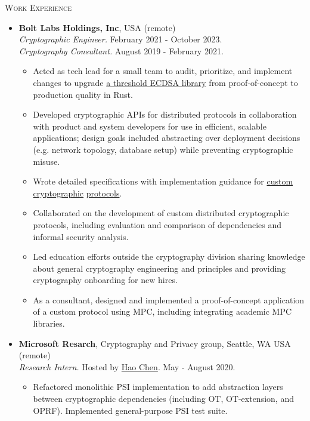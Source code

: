 \documentclass{article}
\begin{document}
\textsc{Work Experience}
\begin{itemize}[label={}, topsep=0pt]
  \item \textbf{Bolt Labs Holdings, Inc}, USA (remote) \\
  \textit{Cryptographic Engineer.} February 2021 - October 2023.\\
  \textit{Cryptography Consultant.} August 2019 - February 2021.
  \begin{itemize}[leftmargin=*, noitemsep, topsep=0pt]
    \item Acted as tech lead for a small team to audit, prioritize, and implement changes to upgrade \href{https://github.com/boltlabs-inc/tss-ecdsa}{a threshold ECDSA library} from proof-of-concept to production quality in Rust.
    \item Developed cryptographic APIs for distributed protocols in collaboration with product and system developers for use in efficient, scalable applications; design goals included abstracting over deployment decisions (e.g. network topology, database setup) while preventing cryptographic misuse.
    \item Wrote detailed specifications with implementation guidance for \href{https://github.com/boltlabs-inc/key-mgmt-spec}{custom cryptographic} \href{https://github.com/boltlabs-inc/zkchannels-spec}{protocols}. 
    \item Collaborated on the development of custom distributed cryptographic protocols, including evaluation and comparison of dependencies and informal security analysis.
    \item Led education efforts outside the cryptography division sharing knowledge about general cryptography engineering and principles and providing cryptography onboarding for new hires.
    \item As a consultant, designed and implemented a proof-of-concept application of a custom protocol using MPC, including integrating academic MPC libraries.
  \end{itemize}
  \item \textbf{Microsoft Resarch}, Cryptography and Privacy group, Seattle, WA USA (remote)\\
  \textit{Research Intern.} Hosted by \href{https://haochenuw.github.io/}{Hao Chen}. May - August 2020.
  \begin{itemize}[leftmargin=*, noitemsep, topsep=0pt, partopsep=0pt]
    \item Refactored monolithic PSI implementation to add abstraction layers between cryptographic dependencies (including OT, OT-extension, and OPRF). Implemented general-purpose PSI test suite.

\end{itemize}
\end{itemize}
\end{document}
